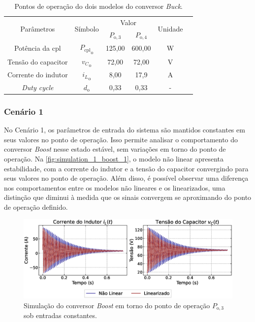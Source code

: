\vspace{8pt}
\begin{table}[H]
  \centering
  \setlength{\tabcolsep}{10pt}
  \begin{tabular}{cccccc}
    \toprule
    \multirow{2}{*}{\centering Parâmetros} & \multirow{2}{*}{\centering Símbolo} & \multicolumn{2}{c}{\centering Valor} & \multirow{2}{*}{\centering Unidade} \\
    \cmidrule{3-4}
     &  & $P_{\mathrm{o}, 3}$ & $P_{\mathrm{o}, 4}$ &  \\
    \midrule
    Potência da \acrshort{cpl} & ${P_{\mathrm{cpl}}}_{\mathrm{o}}$ & 125,00  & 600,00 & W \\
    Tensão do capacitor & ${v_C}_{\mathrm{o}}$ & 72,00 & 72,00  & V \\
    Corrente do indutor & ${i_L}_{\mathrm{o}}$ & 8,00 & 17,9 & A \\
    \textit{\textit{Duty cycle}} & $d_{\mathrm{o}}$ & 0,33 & 0,33 & - \\  
    \bottomrule
  \end{tabular}
  \caption{Pontos de operação do dois modelos do conversor \textit{Buck}.}
  \label{table:op_parameters_boost}
\end{table}

\subsubsection{Cenário 1}

No Cenário 1, os parâmetros de entrada do sistema são mantidos constantes em seus valores no ponto de operação. Isso permite analisar o comportamento do conversor \textit{Boost} nesse estado estável, sem variações em torno do ponto de operação. Na \autoref{fig:simulation_1_boost_1}, o modelo não linear apresenta estabilidade, com a corrente do indutor e a tensão do capacitor convergindo para seus valores no ponto de operação. Além disso, é possível observar uma diferença nos comportamentos entre os modelos não lineares e os linearizados, uma distinção que diminui à medida que os sinais convergem se aproximando do ponto de operação definido.

\begin{figure}[H]
  \centering
  \captionsetup{justification=centering}
  \includegraphics[width=1.\textwidth]{figuras/boost/sim1/op1/result.eps}
  \caption{Simulação do conversor \textit{Boost} em torno do ponto de operação $P_{\mathrm{o}, 3}$ sob entradas constantes.}
  \label{fig:simulation_1_boost_1}
\end{figure}

